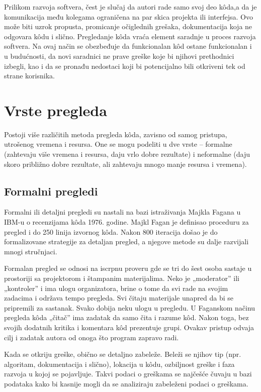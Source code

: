 \documentclass[a4paper]{article}
\begin{document}
Prilikom razvoja softvera, čest je slučaj da autori rade samo svoj deo kôda,a da je komunikacija među kolegama ograničena na par skica projekta ili interfejsa. Ovo može biti uzrok propusta, promicanje očiglednih grešaka, dokumentacija koja ne odgovara kôdu i slično.
Pregledanje kôda vraća element saradnje u proces razvoja softvera.
Na ovaj način se \sloppy obezbeđuje da funkcionalan kôd ostane funkcionalan i u budućnosti, da novi saradnici ne prave greške koje bi njihovi prethodnici izbegli, kao i da se pronađu nedostaci koji bi potencijalno bili otkriveni tek od strane korisnika.


\section{Vrste pregleda}
Postoji više različitih metoda pregleda kôda, zavisno od samog pristupa, utrošenog vremena i resursa.
One se mogu podeliti u dve vrste -- formalne (zahtevaju više vremena i resursa, daju vrlo dobre rezultate) i neformalne (daju skoro približno dobre rezultate, ali zahtevaju mnogo manje resursa i vremena).


  \subsection{Formalni pregledi}
  
  Formalni ili detaljni pregledi su nastali na bazi istraživanja Majkla Fagana u IBM-u o recenzijama kôda 1976. godine. Majkl Fagan je definisao proceduru za pregled i do 250 linija izvornog kôda. Nakon 800 iteracija došao je do formalizovane strategije za detaljan pregled, a njegove metode su dalje razvijali mnogi stručnjaci.
  
  Formalan pregled se odnosi na iscrpnu proveru gde se tri do šest osoba sastaje u prostoriji sa projektorom i štampanim materijalima. Neko je „moderator” ili „kontroler” i ima ulogu organizatora, brine o tome da svi rade na svojim zadacima i održava tempo pregleda. Svi čitaju materijale unapred da bi se pripremili za sastanak. Svako dobija neku ulogu u pregledu. U Faganskom načinu pregleda kôda „čitač” ima zadatak da samo čita i razume kôd. Nakon toga, bez svojih dodatnih kritika i komentara kôd prezentuje grupi. Ovakav pristup odvaja cilj i zadatak autora od onoga što program zapravo radi.
  
  Kada se otkriju greške, obično se detaljno zabeleže. Beleži se njihov tip (npr. algoritam, dokumentacija i slično), lokacija u kôdu, ozbiljnost greške i faza razvoja u kojoj se pojavljuje. Takvi podaci o greškama se najčešće čuvaju u bazi podataka kako bi kasnije mogli da se analiziraju zabeleženi podaci o greškama.
  
\end{document}
